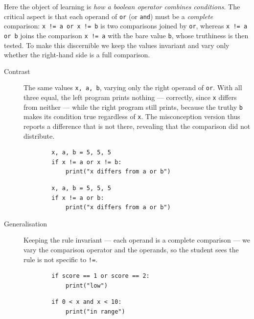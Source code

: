 Here the object of learning is \emph{how a boolean operator combines
conditions}. The critical aspect is that each operand of
\texttt{or} (or \texttt{and}) must be a
\emph{complete} comparison: \texttt{x != a or x != b} is two
comparisons joined by \texttt{or}, whereas
\texttt{x != a or b} joins the comparison \texttt{x != a}
with the bare value \texttt{b}, whose truthiness is then tested. To
make this discernible we keep the values invariant and vary only whether the
right-hand side is a full comparison.

\begin{description}
  \item[Contrast] The same values \texttt{x, a, b}, varying only the
    right operand of \texttt{or}. With all three equal, the left
    program prints nothing --- correctly, since \texttt{x} differs
    from neither --- while the right program still prints, because the truthy
    \texttt{b} makes its condition true regardless of
    \texttt{x}. The misconception version thus reports a difference
    that is not there, revealing that the comparison did not distribute.

    \hfill
    \begin{minipage}[t]{0.45\columnwidth}
      \begin{verbatim}
        x, a, b = 5, 5, 5
        if x != a or x != b:
            print("x differs from a or b")
      \end{verbatim}
    \end{minipage}
    \hfill
    \begin{minipage}[t]{0.45\columnwidth}
      \begin{verbatim}
        x, a, b = 5, 5, 5
        if x != a or b:
            print("x differs from a or b")
      \end{verbatim}
    \end{minipage}

  \item[Generalisation] Keeping the rule invariant --- each operand is a complete
    comparison --- we vary the comparison operator and the operands, so the
    student sees the rule is not specific to \texttt{!=}.

    \hfill
    \begin{minipage}[t]{0.45\columnwidth}
      \begin{verbatim}
        if score == 1 or score == 2:
            print("low")
      \end{verbatim}
    \end{minipage}
    \hfill
    \begin{minipage}[t]{0.45\columnwidth}
      \begin{verbatim}
        if 0 < x and x < 10:
            print("in range")
      \end{verbatim}
    \end{minipage}
\end{description}
